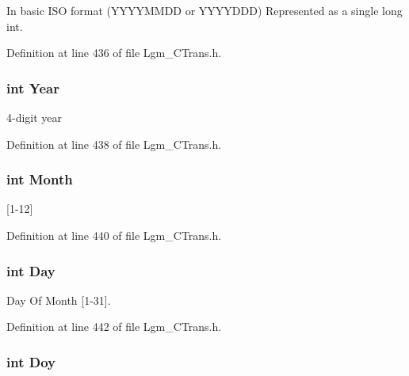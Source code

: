 In basic ISO format (YYYYMMDD or YYYYDDD) Represented as a single long int. 



Definition at line 436 of file Lgm\_\-CTrans.h.\hypertarget{struct_lgm___date_time_42e645110404fbf4f10235789577fa32}{
\subsubsection[{Year}]{\setlength{\rightskip}{0pt plus 5cm}int {\bf Year}}}
\label{struct_lgm___date_time_42e645110404fbf4f10235789577fa32}


4-digit year 



Definition at line 438 of file Lgm\_\-CTrans.h.\hypertarget{struct_lgm___date_time_530b376ec91a278ac98531d3ea17f148}{
\subsubsection[{Month}]{\setlength{\rightskip}{0pt plus 5cm}int {\bf Month}}}
\label{struct_lgm___date_time_530b376ec91a278ac98531d3ea17f148}


\mbox{[}1-12\mbox{]} 



Definition at line 440 of file Lgm\_\-CTrans.h.\hypertarget{struct_lgm___date_time_8f67164de537e3ec2b47e3204ddd3400}{
\subsubsection[{Day}]{\setlength{\rightskip}{0pt plus 5cm}int {\bf Day}}}
\label{struct_lgm___date_time_8f67164de537e3ec2b47e3204ddd3400}


Day Of Month \mbox{[}1-31\mbox{]}. 



Definition at line 442 of file Lgm\_\-CTrans.h.\hypertarget{struct_lgm___date_time_72a1d4d4121176f8cf34faa09b5b4982}{
\subsubsection[{Doy}]{\setlength{\rightskip}{0pt plus 5cm}int {\bf Doy}}}
\label{struct_lgm___date_time_72a1d4d4121176f8cf34faa09b5b4982}



